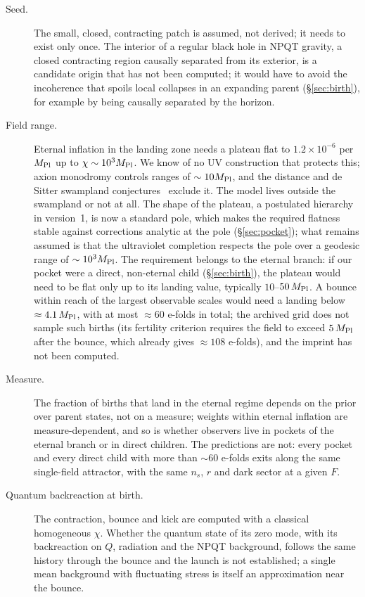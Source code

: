\documentclass[11pt,a4paper]{article}
\newcommand{\Mpl}{M_{\rm Pl}}
\begin{document}
\begin{description}
\item[Seed.] The small, closed, contracting patch is assumed, not derived; it needs to exist only once. The interior of a regular black hole in NPQT gravity, a closed contracting region causally separated from its exterior, is a candidate origin that has not been computed; it would have to avoid the incoherence that spoils local collapses in an expanding parent (\S\ref{sec:birth}), for example by being causally separated by the horizon.
\item[Field range.] Eternal inflation in the landing zone needs a plateau flat to $1.2\times10^{-6}$ per $\Mpl$ up to $\chi\sim10^3\Mpl$. We know of no UV construction that protects this; axion monodromy controls ranges of $\sim10\Mpl$, and the distance and de Sitter swampland conjectures~\cite{Obied2018} exclude it. The model lives outside the swampland or not at all. The shape of the plateau, a postulated hierarchy in version~1, is now a standard pole, which makes the required flatness stable against corrections analytic at the pole (\S\ref{sec:pocket}); what remains assumed is that the ultraviolet completion respects the pole over a geodesic range of $\sim10^3\Mpl$. The requirement belongs to the eternal branch: if our pocket were a direct, non-eternal child (\S\ref{sec:birth}), the plateau would need to be flat only up to its landing value, typically $10$--$50\,\Mpl$. A bounce within reach of the largest observable scales would need a landing below $\approx4.1\,\Mpl$, with at most $\approx60$ e-folds in total; the archived grid does not sample such births (its fertility criterion requires the field to exceed $5\,\Mpl$ after the bounce, which already gives $\approx108$ e-folds), and the imprint has not been computed.
\item[Measure.] The fraction of births that land in the eternal regime depends on the prior over parent states, not on a measure; weights within eternal inflation are measure-dependent, and so is whether observers live in pockets of the eternal branch or in direct children. The predictions are not: every pocket and every direct child with more than $\sim60$ e-folds exits along the same single-field attractor, with the same $n_s$, $r$ and dark sector at a given $F$.
\item[Quantum backreaction at birth.] The contraction, bounce and kick are computed with a classical homogeneous $\chi$. Whether the quantum state of its zero mode, with its backreaction on $Q$, radiation and the NPQT background, follows the same history through the bounce and the launch is not established; a single mean background with fluctuating stress is itself an approximation near the bounce.

\end{description}
\end{document}
